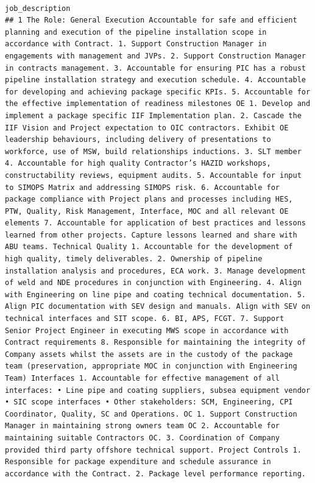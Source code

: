\documentclass[11pt,a4paper,]{article}
\begin{document}
\begin{verbatim}
                                                                                                                                                                                                                                                                                                                                                                                                                                                                                                                                                                                                                                                                                                               job_description
## 1 The Role: General Execution Accountable for safe and efficient planning and execution of the pipeline installation scope in accordance with Contract. 1. Support Construction Manager in engagements with management and JVPs. 2. Support Construction Manager in contracts management. 3. Accountable for ensuring PIC has a robust pipeline installation strategy and execution schedule. 4. Accountable for developing and achieving package specific KPIs. 5. Accountable for the effective implementation of readiness milestones OE 1. Develop and implement a package specific IIF Implementation plan. 2. Cascade the IIF Vision and Project expectation to OIC contractors. Exhibit OE leadership behaviours, including delivery of presentations to workforce, use of MSW, build relationships inductions. 3. SLT member 4. Accountable for high quality Contractor’s HAZID workshops, constructability reviews, equipment audits. 5. Accountable for input to SIMOPS Matrix and addressing SIMOPS risk. 6. Accountable for package compliance with Project plans and processes including HES, PTW, Quality, Risk Management, Interface, MOC and all relevant OE elements 7. Accountable for application of best practices and lessons learned from other projects. Capture lessons learned and share with ABU teams. Technical Quality 1. Accountable for the development of high quality, timely deliverables. 2. Ownership of pipeline installation analysis and procedures, ECA work. 3. Manage development of weld and NDE procedures in conjunction with Engineering. 4. Align with Engineering on line pipe and coating technical documentation. 5. Align PIC documentation with SEV design and manuals. Align with SEV on technical interfaces and SIT scope. 6. BI, APS, FCGT. 7. Support Senior Project Engineer in executing MWS scope in accordance with Contract requirements 8. Responsible for maintaining the integrity of Company assets whilst the assets are in the custody of the package team (preservation, appropriate MOC in conjunction with Engineering Team) Interfaces 1. Accountable for effective management of all interfaces: • Line pipe and coating suppliers, subsea equipment vendor • SIC scope interfaces • Other stakeholders: SCM, Engineering, CPI Coordinator, Quality, SC and Operations. OC 1. Support Construction Manager in maintaining strong owners team OC 2. Accountable for maintaining suitable Contractors OC. 3. Coordination of Company provided third party offshore technical support. Project Controls 1. Responsible for package expenditure and schedule assurance in accordance with the Contract. 2. Package level performance reporting. 
\end{verbatim}
\end{document}
